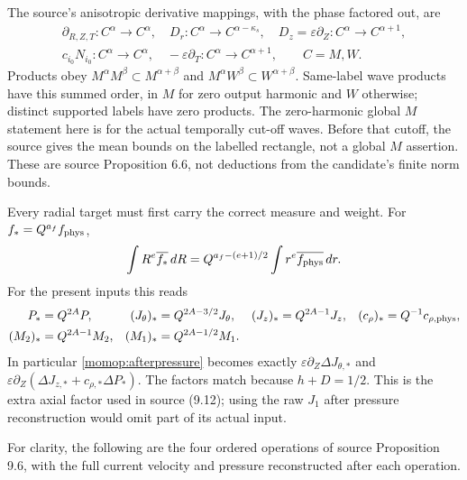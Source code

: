 The source's anisotropic derivative mappings, with the phase factored
out, are
\[
\begin{gathered}
 \partial_{R,Z,T}:C^\alpha\to C^\alpha,\quad
 D_r:C^\alpha\to C^{\alpha-\kappa_s},\quad
 D_z=\varepsilon\partial_Z:C^\alpha\to C^{\alpha+1},\\
 c_{i_0}N_{i_0}:C^\alpha\to C^\alpha,\quad
 -\varepsilon\partial_T:C^\alpha\to C^{\alpha+1},
 \qquad C=M,W.
\end{gathered}
\]
Products obey $M^\alpha M^\beta\subset M^{\alpha+\beta}$ and
$M^\alpha W^\beta\subset W^{\alpha+\beta}$. Same-label wave
products have this summed order, in $M$ for zero output harmonic
and $W$ otherwise; distinct supported labels have zero products.
The zero-harmonic global $M$ statement here is for the actual temporally
cut-off waves. Before that cutoff, the source gives the mean bounds on
the labelled rectangle, not a global $M$ assertion.
These are source Proposition 6.6, not deductions from the candidate's
finite norm bounds.

Every radial target must first carry the correct measure and weight.
For $f_*=Q^{a_f}f_{\rm phys}$,
\[
 \int R^e\overline{f_*}\,dR
       =Q^{a_f-(e+1)/2}\int r^e\overline{f_{\rm phys}}\,dr .
\]
For the present inputs this reads
\begin{align*}
 P_*&=Q^{2A}P,&
 (J_\theta)_*&=Q^{2A-3/2}J_\theta,&
 (J_z)_*&=Q^{2A-1}J_z,&
 (c_\rho)_*&=Q^{-1}c_{\rho,\rm phys},\\
 (M_2)_*&=Q^{2A-1}M_2,&
 (M_1)_*&=Q^{2A-1/2}M_1 .
\end{align*}
In particular \eqref{momop:afterpressure} becomes exactly
$\varepsilon\partial_Z\Delta J_{\theta,*}$ and
$\varepsilon\partial_Z(\Delta J_{z,*}+c_{\rho,*}\Delta P_*)$.
The factors match because $h+D=1/2$. This is the extra axial
factor used in source (9.12); using the raw $J_1$ after pressure
reconstruction would omit part of its actual input.

For clarity, the following are the four ordered operations of source
Proposition 9.6, with the full current velocity and pressure
reconstructed after each operation.

